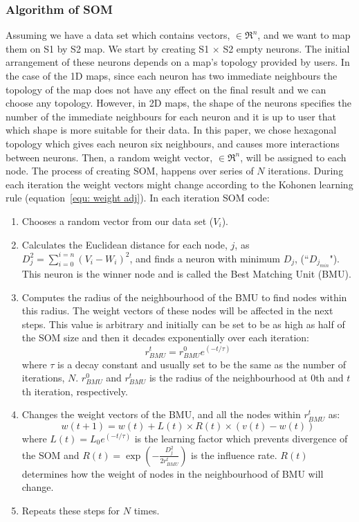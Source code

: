  \subsubsection{Algorithm of SOM} 
 \label{sec: algorithm}
     Assuming we have a data set which contains vectors,  $\in \Re^n$, and we want to map them on S1 by S2 map. 
     We start by creating S1 $\times$ S2 empty neurons. 
     The initial arrangement of these neurons depends on a map's topology provided by users.
     In the case of the 1D maps, since each neuron has two immediate neighbours the topology of the map does not have any effect on the final result and we can choose any topology.
     However, in 2D maps, the shape of the neurons specifies the number of the immediate neighbours for each neuron and it is up to user that which shape is more suitable for their data.
     In this paper, we chose hexagonal topology which gives each neuron six neighbours, and causes more interactions between neurons.
     Then, a random weight vector,  $\in \Re^n$, will be assigned to each node.
     The process of creating SOM, happens over series of $N$ iterations. 
     During each iteration the weight vectors might change according to the Kohonen learning rule (equation~\ref{equ: weight adj}). 
      In each iteration SOM code:
     \begin{enumerate}
        \item Chooses a random vector from our data set ($V_i$).
        \item Calculates the Euclidean distance for each node, $j$, as  $D_j^2= \sum_{i=0}^{i=n} (V_i - W_i)^2$, and finds a neuron with minimum $D_j$, (``$D_{j_{min}}$"). This neuron is the winner node and is called the Best Matching Unit (BMU). 
        \item  Computes the radius of the neighbourhood of the BMU to find nodes within this radius. The weight vectors of these nodes will be affected in the next steps. This value is arbitrary and initially can be set to be as high as half of the SOM size and then it decades exponentially over each iteration:
        \begin{equation}
            r^t_{BMU} = r^0_{BMU}e^{(-t/\tau)}
        \end{equation}
        where $\tau$ is a decay constant and usually set to be the same as the number of iterations, $N$. $r^0_{BMU}$ and $r^t_{BMU}$ is the radius of the neighbourhood at 0th and $t$th iteration, respectively. 
        \item Changes the weight vectors of the BMU, and all the nodes within $r^t_{BMU}$ as:
        \begin{equation}
            \label{equ: weight adj}
            w(t+1)=w(t)+L(t) \times R(t) \times(v(t)-w(t))
        \end{equation}
        where $L(t) = L_0 e^{(-t/\tau)}$ is the learning factor which prevents divergence of the SOM and $R(t)=\exp(-\frac{D_j^2}{2r^t_{BMU}})$ is the influence rate. $R(t)$ determines how the weight of nodes in the neighbourhood of BMU will change.
        \item  Repeats these steps for $N$ times.
     \end{enumerate}
     
